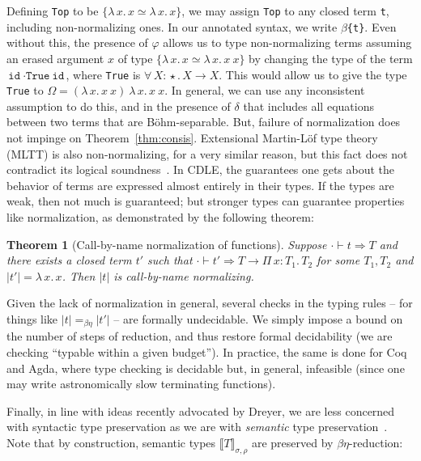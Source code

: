 \documentclass{article}
\newcommand{\abs}[4]{{#1}\, #2\! : \! #3.\, #4}
\newcommand{\absu}[3]{{#1}\, #2.\, #3}
\newcommand{\interp}[1]{\llbracket #1 \rrbracket}
\newcommand{\tpsynth}[0]{\Rightarrow}
\newtheorem{theorem}{Theorem}
\begin{document}
Defining \verb|Top| to be $\{\absu{\lambda}{x}{x} \simeq
\absu{\lambda}{x}{x}\}$, we may assign \verb|Top| to any closed term \verb|t|,
including non-normalizing ones. In our annotated syntax, we write
\texttt{\(\beta\)\{t\}}.
Even without this, the presence of \(\varphi\) allows us to type non-normalizing
terms assuming an erased argument \(x\) of type \(\{\absu{\lambda}{x}{x} \simeq
\absu{\lambda}{x}{x\ x}\}\) by changing the type of the term \(\texttt{id}\
\cdot \texttt{True}\ \texttt{id}\), where \texttt{True} is
\(\abs{\forall}{X}{\star}{X \to X}\).
This would allow us to give the type \texttt{True} to \(\Omega = (\absu{\lambda}{x}{x\ x})\
\absu{\lambda}{x}{x\ x}\).
In general, we can use any inconsistent assumption to do this, and in the
presence of \(\delta\) that includes all equations between two terms that are
B\"ohm-separable.
But, failure of normalization does not
impinge on Theorem~\ref{thm:consis}. Extensional Martin-L\"of type theory (MLTT)
is also non-normalizing, for a very similar reason, but this fact does not contradict
its logical soundness~\cite{dybjer16}. In CDLE, the guarantees one gets about
the behavior of terms are expressed almost entirely in their types. If the types
are weak, then not much is guaranteed; but stronger types can guarantee
properties like normalization, as demonstrated by the following theorem:

\begin{theorem}[Call-by-name normalization of functions]
  \label{thm:cedille-termination}
  Suppose \(\cdot \vdash t \tpsynth T\) and there exists a closed term \(t'\)
  such that \(\cdot \vdash t' \tpsynth T \to \abs{\Pi}{x}{T_1}{T_2}\) for some
  \(T_1,T_2\) and \(|t'| = \absu{\lambda}{x}{x}\).
  Then \(|t|\) is call-by-name normalizing.
\end{theorem}

Given the lack of normalization in general, several checks in the typing rules --
for things like $|t| =_{\beta\eta} |t'|$ -- are formally undecidable.
We simply impose a bound on the number of steps of reduction,
and thus restore formal decidability (we are checking ``typable within
a given budget'').  In practice, the same is done for Coq and Agda,
where type checking is decidable but, in general, infeasible (since one
may write astronomically slow terminating functions).

Finally, in line with ideas recently advocated by Dreyer, we
are less concerned with syntactic
type preservation as we are with \emph{semantic} type
preservation~\cite{dreyer18}.
Note that by construction, semantic types $\interp{T}_{\sigma,\rho}$ are
preserved by $\beta\eta$-reduction:
\end{document}
